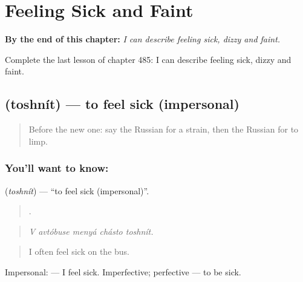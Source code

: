 
\chapter{Feeling Sick and Faint}
\label{ch:ru-feeling-sick-and-faint}

\begin{chapteropening}
\textbf{By the end of this chapter:} \emph{I can describe feeling sick, dizzy and faint.}

Complete the last lesson of chapter 485: I can describe feeling sick, dizzy and faint.
\end{chapteropening}

\section[\texorpdfstring{\ru{тошнить} (toshnít)}{тошнить (toshnít)}]{ (toshnít) — to feel sick (impersonal)}

\label{lesson:RU-C485-toshnit}



\begin{quote}
Before the new one: say the Russian for a strain, then the Russian for to limp.
\end{quote}

\subsection*{You'll want to know: }
\textbf{} (\emph{toshnít}) — \textquotedblleft{}to feel sick (impersonal)\textquotedblright{}.

\begin{quote}
    .
\end{quote}

\begin{quote}
\emph{V avtóbuse menyá chásto toshnít.}
\end{quote}

\begin{quote}
I often feel sick on the bus.
\end{quote}

Impersonal: \emph{ } — I feel sick. Imperfective; perfective  — to be sick.

